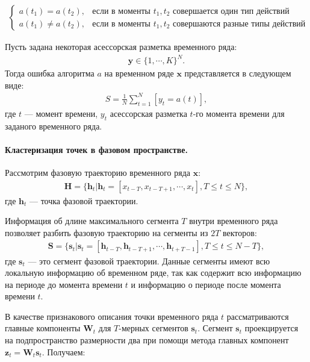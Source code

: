 \[
\label{eq:st:5}
\begin{aligned}
\begin{cases}
    a\left(t_1\right) = a\left(t_2\right), &  \text{если в моменты } t_1, t_2 \text{ совершается один тип действий}\\
    a\left(t_1\right) \not= a\left(t_2\right), &  \text{если в моменты } t_1, t_2 \text{ совершаются разные типы действий }
\end{cases}
\end{aligned}
\]

Пусть задана некоторая асессорская разметка временного ряда:
\[
\label{eq:st:6}
\begin{aligned}
\textbf{y} \in \{1,\cdots,K\}^{N}.
\end{aligned}
\]
Тогда ошибка алгоритма $a$ на временном ряде $\textbf{x}$ представляется в следующем виде:
\[
\label{eq:st:7}
\begin{aligned}
S = \frac{1}{N}\sum_{t=1}^{N}[y_t = a\left(t\right)],
\end{aligned}
\]
где $t$ --- момент времени, $y_t$ асессорская разметка $t$-го момента времени для заданого временного ряда.


\paragraph{Кластеризация точек в фазовом пространстве.}
Рассмотрим фазовую траекторию временного ряда $\textbf{x}$:
\[
\label{eq:cl:1}
\begin{aligned}
\mathbf{H} = \{\textbf{h}_t| \textbf{h}_t = [x_{t-T}, x_{t-T+1}, \cdots, x_{t}], T\leq t\leq N\},
\end{aligned}
\]
где $\textbf{h}_t$ --- точка фазовой траектории.

Информация об длине максимального сегмента $T$ внутри временного ряда позволяет разбить фазовую траекторию на сегменты из $2T$ векторов:
\[
\label{eq:cl:2}
\begin{aligned}
\mathbf{S} = \{\textbf{s}_t| \textbf{s}_t = [\textbf{h}_{t-T}, \textbf{h}_{t-T+1}, \cdots, \textbf{h}_{t+T-1}], T\leq t\leq N-T\},
\end{aligned}
\]
где $\textbf{s}_t$ --- это сегмент фазовой траектории. Данные сегменты имеют всю локальную информацию об временном ряде, так как содержит всю информацию на периоде до момента времени $t$ и информацию о периоде после момента времени $t$.

В качестве признакового описания точки временного ряда $t$ рассматриваются главные компоненты $\textbf{W}_t$ для $T\text{-мерных}$ сегментов $\textbf{s}_t$. Сегмент $\textbf{s}_t$ проекцируется на подпространство размерности два при помощи метода главных  компонент $\textbf{z}_t = \textbf{W}_t\textbf{s}_t$. Получаем:

